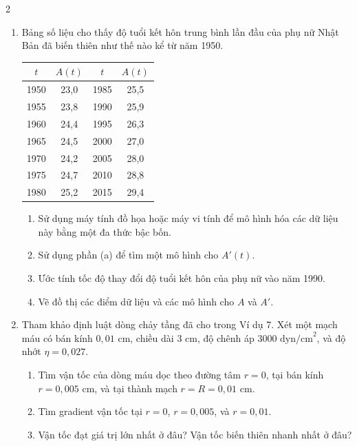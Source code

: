 \begin{multicols}{2}
\begin{enumerate}[label=\textbf{\arabic*.}, leftmargin=*, itemsep=10pt, topsep=0pt]
  \item[\techicon~\textbf{30.}] Bảng số liệu cho thấy độ tuổi kết hôn trung bình lần đầu của phụ nữ Nhật Bản đã biến thiên như thế nào kể từ năm 1950.

  \begin{center}
  \small
  \renewcommand{\arraystretch}{1.15}
  \begin{tabular}{|c|c|c|c|}
  \hline
  \rowcolor{tableblue}
  $t$ & $A(t)$ & $t$ & $A(t)$ \\
  \hline
  1950 & 23{,}0 & 1985 & 25{,}5 \\
  1955 & 23{,}8 & 1990 & 25{,}9 \\
  1960 & 24{,}4 & 1995 & 26{,}3 \\
  1965 & 24{,}5 & 2000 & 27{,}0 \\
  1970 & 24{,}2 & 2005 & 28{,}0 \\
  1975 & 24{,}7 & 2010 & 28{,}8 \\
  1980 & 25{,}2 & 2015 & 29{,}4 \\
  \hline
  \end{tabular}
  \end{center}

  \begin{enumerate}[label=(\alph*), itemsep=3pt, topsep=2pt, leftmargin=*]
    \item Sử dụng máy tính đồ họa hoặc máy vi tính để mô hình hóa các dữ liệu này bằng một đa thức bậc bốn.
    \item Sử dụng phần (a) để tìm một mô hình cho $A'(t)$.
    \item Ước tính tốc độ thay đổi độ tuổi kết hôn của phụ nữ vào năm 1990.
    \item Vẽ đồ thị các điểm dữ liệu và các mô hình cho $A$ và $A'$.
  \end{enumerate}

  \item Tham khảo định luật dòng chảy tầng đã cho trong Ví dụ 7. Xét một mạch máu có bán kính $0{,}01\text{ cm}$, chiều dài $3\text{ cm}$, độ chênh áp $3000\text{ dyn/cm}^2$, và độ nhớt $\eta = 0{,}027$.
  \begin{enumerate}[label=(\alph*), itemsep=2pt, topsep=2pt, leftmargin=*]
    \item Tìm vận tốc của dòng máu dọc theo đường tâm $r = 0$, tại bán kính $r = 0{,}005\text{ cm}$, và tại thành mạch $r = R = 0{,}01\text{ cm}$.
    \item Tìm gradient vận tốc tại $r = 0$, $r = 0{,}005$, và $r = 0{,}01$.
    \item Vận tốc đạt giá trị lớn nhất ở đâu? Vận tốc biến thiên nhanh nhất ở đâu?
  \end{enumerate}


\end{enumerate}
\end{multicols}
